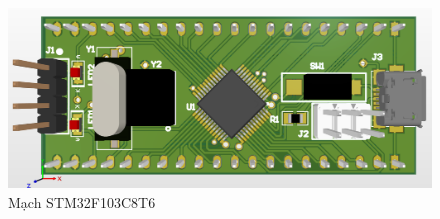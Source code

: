             \begin{figure}[H]
                \centering
                \includegraphics[width=1\textwidth]{pictures/pcb5.png}
                \caption{Mạch STM32F103C8T6}
                \label{fig:hbridge}
            \end{figure}
            \cleardoublepage